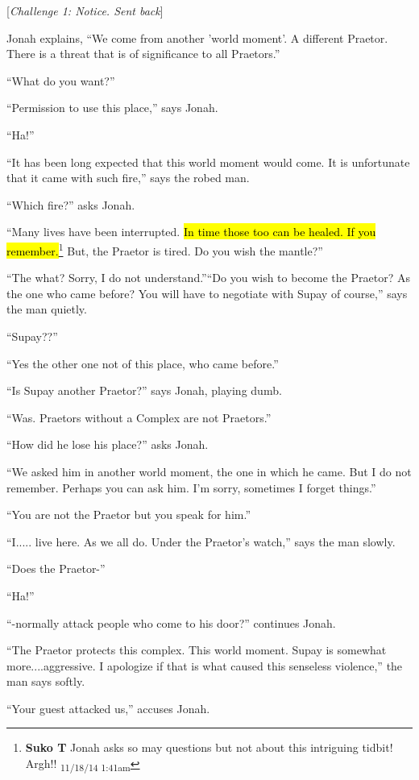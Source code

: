 {[}\textit{Challenge 1: Notice.  Sent back}{]}

Jonah explains, ``We come from another 'world moment'.  A different Praetor.  There is a threat that is of significance to all Praetors.''

``What do you want?''

``Permission to use this place,'' says Jonah.

``Ha!''

``It has been long expected that this world moment would come.  It is unfortunate that it came with such fire,'' says the robed man.

``Which fire?'' asks Jonah.

``Many lives have been interrupted.  \hl{In time those too can be healed.  If you remember.}\footnote{\textbf{Suko T }Jonah asks so may questions but not about this intriguing tidbit! Argh!! \textsubscript{11/18/14 1:41am}} But, the Praetor is tired.  Do you wish the mantle?''

``The what? Sorry, I do not understand.''``Do you wish to become the Praetor?  As the one who came before?  You will have to negotiate with Supay of course,'' says the man quietly.

``Supay??''

``Yes the other one not of this place, who came before.''

``Is Supay another Praetor?'' says Jonah, playing dumb.

``Was. Praetors without a Complex are not Praetors.''

``How did he lose his place?'' asks Jonah.

``We asked him in another world moment, the one in which he came. But I do not remember.  Perhaps you can ask him.  I'm sorry, sometimes I forget things.''

``You are not the Praetor but you speak for him.''

``I..... live here.  As we all do.  Under the Praetor's watch,'' says the man slowly.

``Does the Praetor-''

``Ha!''

``-normally attack people who come to his door?'' continues Jonah.

``The Praetor protects this complex.  This world moment.  Supay is somewhat more....aggressive.  I apologize if that is what caused this senseless violence,''  the man says softly.

``Your guest attacked us,'' accuses Jonah.


